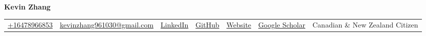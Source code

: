 \documentclass{article}
\begin{document}
    \fontsize{9}{14.5}
    \selectfont
    \begin{center}
        \begin{center}
            \huge\bfseries Kevin Zhang
        \end{center}
            \begin{tabular}{c|c|c|c|c|c|c}
                \href{tel:+16478966853}{+16478966853} &
                \href{mailto:kevinzhang961030@gmail.com}{kevinzhang961030@gmail.com} & 
                \href{https://www.linkedin.com/in/kevin-zhang-uoft/}{LinkedIn} & 
                \href{https://github.com/diebrate/}{GitHub} &
                \href{https://diebrate.github.io/}{Website} &
                \href{https://scholar.google.com/citations?user=PgUJ04cAAAAJ&hl=en}{Google Scholar} &
                Canadian \& New Zealand Citizen
        \end{tabular}
    \end{center}    
    \vspace{-0.75em}
    
    
    
    
    
    
  
\end{document}

